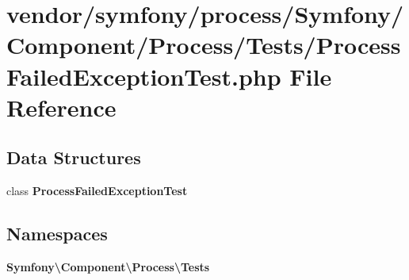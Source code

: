 \section{vendor/symfony/process/\+Symfony/\+Component/\+Process/\+Tests/\+Process\+Failed\+Exception\+Test.php File Reference}
\label{_process_failed_exception_test_8php}
\subsection*{Data Structures}
\begin{DoxyCompactItemize}
\item 
class {\bf Process\+Failed\+Exception\+Test}
\end{DoxyCompactItemize}
\subsection*{Namespaces}
\begin{DoxyCompactItemize}
\item 
 {\bf Symfony\textbackslash{}\+Component\textbackslash{}\+Process\textbackslash{}\+Tests}
\end{DoxyCompactItemize}
